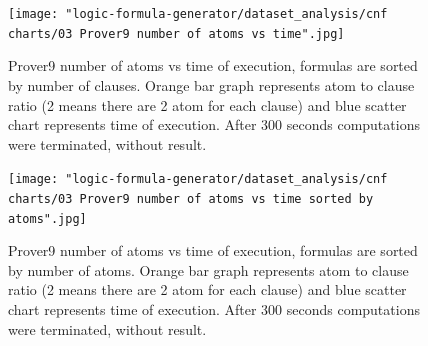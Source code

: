 \begin{figure}[h]
  \centering
  \texttt{[image: "logic-formula-generator/dataset\_analysis/cnf charts/03 Prover9 number of atoms vs time".jpg]}
  \caption{Prover9 number of atoms vs time of execution, formulas are sorted by number of clauses. Orange bar graph represents atom to clause ratio (2 means there are 2 atom for each clause) and blue scatter chart represents time of execution. After 300 seconds computations were terminated, without result.}
  \label{pic:Prover9NumberOfAtomsVsTime}
\end{figure}

\begin{figure}[h]
  \centering
  \texttt{[image: "logic-formula-generator/dataset\_analysis/cnf charts/03 Prover9 number of atoms vs time sorted by atoms".jpg]}
  \caption{Prover9 number of atoms vs time of execution, formulas are sorted by number of atoms. Orange bar graph represents atom to clause ratio (2 means there are 2 atom for each clause) and blue scatter chart represents time of execution. After 300 seconds computations were terminated, without result.}
  \label{pic:Prover9NumberOfAtomsVsTimeSortedByAtoms}
\end{figure}
